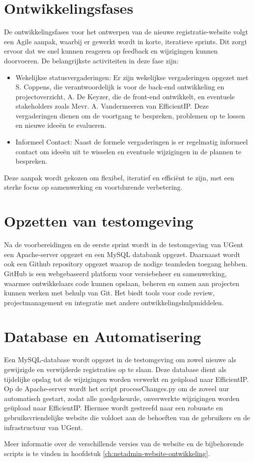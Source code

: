 \section{Ontwikkelingsfases}
De ontwikkelingsfases voor het ontwerpen van de nieuwe registratie-website volgt een Agile aanpak, waarbij er gewerkt wordt in korte, iteratieve sprints. Dit zorgt ervoor dat we snel kunnen reageren op feedback en wijzigingen kunnen doorvoeren. De belangrijkste activiteiten in deze fase zijn:
\begin{itemize}
    \item Wekelijkse statusvergaderingen: Er zijn wekelijkse vergaderingen opgezet met S. Coppens, die verantwoordelijk is voor de back-end ontwikkeling en projectoverzicht, A. De Keyzer, die de front-end ontwikkelt, en eventuele stakeholders zoals Mevr. A. Vandermeeren van EfficientIP. Deze vergaderingen dienen om de voortgang te bespreken, problemen op te lossen en nieuwe ideeën te evalueren.
    \item Informeel Contact: Naast de formele vergaderingen is er regelmatig informeel contact om ideeën uit te wisselen en eventuele wijzigingen in de plannen te bespreken.
\end{itemize}
Deze aanpak wordt gekozen om flexibel, iteratief en efficiënt te zijn, met een sterke focus op samenwerking en voortdurende verbetering. 

\section{Opzetten van testomgeving}
Na de voorbereidingen en de eerste sprint wordt in de testomgeving van UGent een Apache-server opgezet en een MySQL databank opgezet. 
Daarnaast wordt ook een Github repository opgezet waarop de nodige teamleden toegang hebben. GitHub is een webgebaseerd platform voor versiebeheer en samenwerking, waarmee ontwikkelaars code kunnen opslaan, beheren en samen aan projecten kunnen werken met behulp van Git. Het biedt tools voor code review, projectmanagement en integratie met andere ontwikkelingshulpmiddelen.

\section{Database en Automatisering}
Een MySQL-database wordt opgezet in de testomgeving om zowel nieuwe als gewijzigde en verwijderde registraties op te slaan. Deze database dient als tijdelijke opslag tot de wijzigingen worden verwerkt en geüpload naar EfficientIP. Op de Apache-server wordt het script processChanges.py om de zoveel uur automatisch gestart, zodat alle goedgekeurde, onverwerkte wijzigingen worden geüpload naar EfficientIP. Hiermee wordt gestreefd naar een robuuste en gebruiksvriendelijke website die voldoet aan de behoeften van de gebruikers en de infrastructuur van UGent.

Meer informatie over de verschillende versies van de website en de bijbehorende scripts is te vinden in hoofdstuk \ref{ch:netadmin-website-ontwikkeling}.

